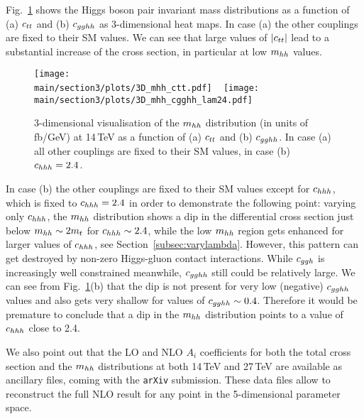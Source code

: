 Fig.~\ref{fig:ctt_3D} shows the Higgs boson pair invariant mass
distributions as a function of (a) $c_{tt}$ and (b) $c_{gghh}$ as 3-dimensional heat maps.
In case (a) the other couplings are fixed to their SM values.
We can see that large values of $|c_{tt}|$ lead to a substantial increase of the cross section, in particular at low $m_{hh}$ values.
%  
\begin{figure}[ht]
\begin{center}
  \texttt{[image: \\main/section3/plots/3D\_mhh\_ctt.pdf]}    
~
\texttt{[image: \\main/section3/plots/3D\_mhh\_cgghh\_lam24.pdf]}
\end{center}
\caption{3-dimensional visualisation of the $m_{hh}$ distribution (in units of fb/GeV) at 14\,TeV as a function of (a) $c_{tt}$  and (b) $c_{gghh}$.  In case (a) all
other couplings are fixed to their SM values, in case (b) $c_{hhh}= 2.4$.}
\label{fig:ctt_3D}
\end{figure}
In case (b) the other couplings are fixed to their SM values except for $c_{hhh}$, which is fixed to $c_{hhh}=2.4$
in order to demonstrate the following point: varying only $c_{hhh}$, the $m_{hh}$ distribution shows a dip in the differential cross section just below $m_{hh}\sim 2m_t$ for $c_{hhh}\sim 2.4$, while the low $m_{hh}$ region gets enhanced for larger values of $c_{hhh}$, see Section~\ref{subsec:varylambda}.
 However, this pattern can get destroyed by non-zero
 Higgs-gluon contact interactions. While $c_{ggh}$ is increasingly well constrained meanwhile,
 $c_{gghh}$ still could be relatively large. We can see from Fig.~\ref{fig:ctt_3D}(b) that the dip is not present for very low (negative) $c_{gghh}$ values and also gets very shallow for values of $c_{gghh}\sim 0.4$.
 Therefore it would be premature to conclude that a dip in the $m_{hh}$ distribution points to a value of $c_{hhh}$ close to 2.4.

We also point out that the LO and NLO $A_i$ coefficients for both the total cross
section and the $m_{hh}$ distributions at both 14\,TeV and 27\,TeV are
available as ancillary files, coming with the {\tt arXiv} submission. These data files allow to reconstruct the full NLO result for any point in the 5-dimensional parameter space.



